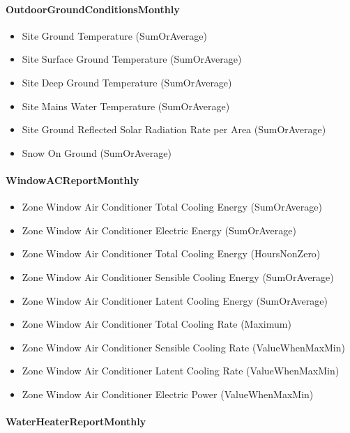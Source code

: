\paragraph{OutdoorGroundConditionsMonthly}\label{outdoorgroundconditionsmonthly}

\begin{itemize}
\item
  Site Ground Temperature (SumOrAverage)
\item
  Site Surface Ground Temperature (SumOrAverage)
\item
  Site Deep Ground Temperature (SumOrAverage)
\item
  Site Mains Water Temperature (SumOrAverage)
\item
  Site Ground Reflected Solar Radiation Rate per Area (SumOrAverage)
\item
  Snow On Ground (SumOrAverage)
\end{itemize}

\paragraph{WindowACReportMonthly}\label{windowacreportmonthly}

\begin{itemize}
\item
  Zone Window Air Conditioner Total Cooling Energy (SumOrAverage)
\item
  Zone Window Air Conditioner Electric Energy (SumOrAverage)
\item
  Zone Window Air Conditioner Total Cooling Energy (HoursNonZero)
\item
  Zone Window Air Conditioner Sensible Cooling Energy (SumOrAverage)
\item
  Zone Window Air Conditioner Latent Cooling Energy (SumOrAverage)
\item
  Zone Window Air Conditioner Total Cooling Rate (Maximum)
\item
  Zone Window Air Conditioner Sensible Cooling Rate (ValueWhenMaxMin)
\item
  Zone Window Air Conditioner Latent Cooling Rate (ValueWhenMaxMin)
\item
  Zone Window Air Conditioner Electric Power (ValueWhenMaxMin)
\end{itemize}

\paragraph{WaterHeaterReportMonthly}\label{waterheaterreportmonthly}

